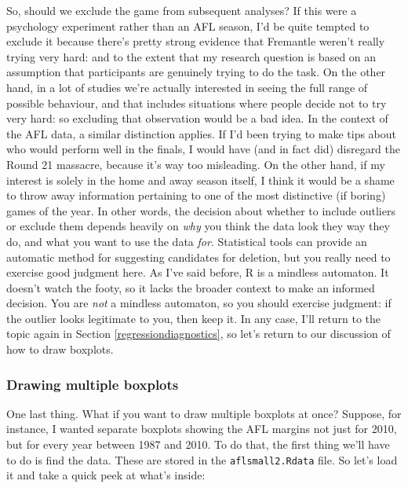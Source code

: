 \documentclass[
]{book}
\newenvironment{Shaded}{\begin{snugshade}}{\end{snugshade}}
\newcommand{\CommentTok}[1]{\textcolor[rgb]{0.56,0.35,0.01}{\textit{#1}}}
\newcommand{\ConstantTok}[1]{\textcolor[rgb]{0.00,0.00,0.00}{#1}}
\newcommand{\FunctionTok}[1]{\textcolor[rgb]{0.00,0.00,0.00}{#1}}
\newcommand{\NormalTok}[1]{#1}
\newcommand{\StringTok}[1]{\textcolor[rgb]{0.31,0.60,0.02}{#1}}
\begin{document}
So, should we exclude the game from subsequent analyses? If this were a psychology experiment rather than an AFL season, I'd be quite tempted to exclude it because there's pretty strong evidence that Fremantle weren't really trying very hard: and to the extent that my research question is based on an assumption that participants are genuinely trying to do the task. On the other hand, in a lot of studies we're actually interested in seeing the full range of possible behaviour, and that includes situations where people decide not to try very hard: so excluding that observation would be a bad idea. In the context of the AFL data, a similar distinction applies. If I'd been trying to make tips about who would perform well in the finals, I would have (and in fact did) disregard the Round 21 massacre, because it's way too misleading. On the other hand, if my interest is solely in the home and away season itself, I think it would be a shame to throw away information pertaining to one of the most distinctive (if boring) games of the year. In other words, the decision about whether to include outliers or exclude them depends heavily on \emph{why} you think the data look they way they do, and what you want to use the data \emph{for}. Statistical tools can provide an automatic method for suggesting candidates for deletion, but you really need to exercise good judgment here. As I've said before, R is a mindless automaton. It doesn't watch the footy, so it lacks the broader context to make an informed decision. You are \emph{not} a mindless automaton, so you should exercise judgment: if the outlier looks legitimate to you, then keep it. In any case, I'll return to the topic again in Section \ref{regressiondiagnostics}, so let's return to our discussion of how to draw boxplots.

\hypertarget{multipleboxplots}{%
\subsubsection{Drawing multiple boxplots}\label{multipleboxplots}}

One last thing. What if you want to draw multiple boxplots at once? Suppose, for instance, I wanted separate boxplots showing the AFL margins not just for 2010, but for every year between 1987 and 2010. To do that, the first thing we'll have to do is find the data. These are stored in the \texttt{aflsmall2.Rdata} file. So let's load it and take a quick peek at what's inside:

\begin{Shaded}
\end{Shaded}
\end{document}
